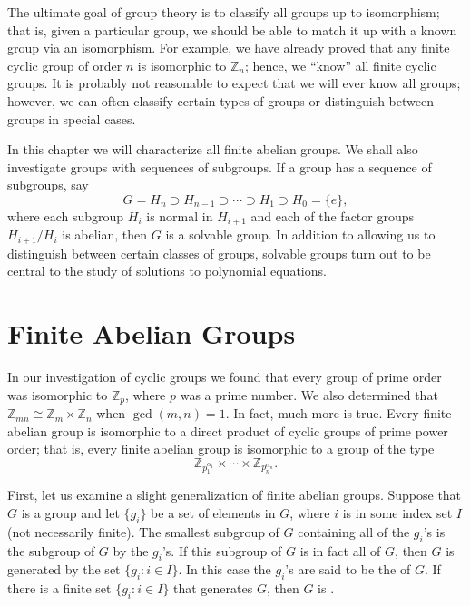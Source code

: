  

The ultimate goal of group theory is to classify all groups up to
isomorphism; that is, given a particular group, we should be able to
match it up with a known group via an isomorphism. For example, we
have already proved that any finite cyclic group of order $n$ is
isomorphic to ${\mathbb Z}_n$; hence, we ``know'' all finite cyclic
groups. It is probably not reasonable to expect that we will ever know
all groups; however, we can often classify certain types of groups or
distinguish between groups in special cases.  

In this chapter we will characterize all finite abelian groups. We
shall also investigate groups with sequences of subgroups.  If a group
has a sequence of subgroups, say 
\[
G = H_n \supset H_{n-1} \supset \cdots \supset H_1 \supset H_0 = \{ e
\}, 
\]
where each subgroup $H_i$ is normal in $H_{i+1}$ and each of the
factor groups $H_{i+1}/H_i$ is abelian, then $G$ is a solvable group.
In addition to allowing us to distinguish between certain classes of
groups, solvable groups turn out to be central to the study of
solutions to polynomial equations.
 

\section{Finite Abelian Groups}

In our investigation of cyclic groups we found that every group of
prime order was isomorphic to ${\mathbb Z}_p$, where $p$ was a prime
number.  We also determined that ${\mathbb Z}_{mn} \cong {\mathbb Z}_m
\times {\mathbb Z}_n$ when $\gcd(m, n) =1$. In fact, much more is true.
Every finite abelian group is isomorphic to a direct product of cyclic
groups of prime power order; that is, every finite abelian group is
isomorphic to a group of the type 
\[
{\mathbb Z}_{p_1^{\alpha_1}} \times \cdots \times {\mathbb
Z}_{p_n^{\alpha_n}}.
\]

First, let us examine a slight generalization  of finite abelian
groups. Suppose that $G$ is a group and let $\{ g_i\}$ be a set of 
elements in $G$, where $i$ is in some index set $I$ (not necessarily 
finite).  The smallest subgroup of $G$ containing all of the $g_i$'s 
is the subgroup of $G$  by the $g_i$'s. If this 
subgroup of $G$ is in fact all of $G$, then $G$ is generated by the 
set $\{g_i : i \in I \}$. In this case the $g_i$'s are said to be 
the  of $G$. If there is a finite set 
$\{ g_i : i \in I \}$ that generates $G$, then $G$ is .
 
